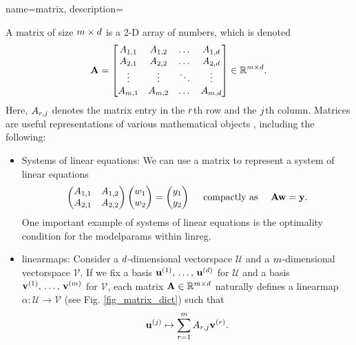 {name={matrix},
	description={A matrix of size $m \times d$ is a 2-D array of numbers, 
 		which is denoted  
		$$
  		{\bf A} = \begin{bmatrix}
   		A_{1,1} & A_{1,2} & \dots  & A_{1,d} \\
		A_{2,1} & A_{2,2} & \dots  & A_{2,d} \\
		\vdots  & \vdots  & \ddots & \vdots \\
		A_{m,1} & A_{m,2} & \dots  & A_{m,d}
		\end{bmatrix} \in \mathbb{R}^{m \times d}.
		$$
		Here, $A_{r,j}$ denotes the matrix entry in the $r$th row and the 
		$j$th column. Matrices are useful representations of various mathematical objects \cite{StrangLinAlg2016},
		including the following:
		\begin{itemize}
			\item Systems of linear equations: We can use a matrix to represent a system of linear equations 
			$$ \begin{pmatrix}
			A_{1,1} & A_{1,2} \\
			A_{2,1} & A_{2,2}
			\end{pmatrix}
			\begin{pmatrix}
				w_1 \\
				w_2
			\end{pmatrix}
			=\begin{pmatrix}
				y_1 \\
				y_2
			\end{pmatrix}
			\quad \text{ compactly as } \quad {\bf A} {\bf w} = {\bf y}.
			$$
    			One important example of systems of linear equations is the optimality condition for the 
    			\gls{modelparams} within \gls{linreg}. 
			\item \Glspl{linearmap}:
			Consider a $d$-dimensional \gls{vectorspace} $\mathcal{U}$ and a $m$-dimensional \gls{vectorspace} $\mathcal{V}$. 
			If we fix a basis $\mathbf{u}^{(1)},\,\ldots,\,\mathbf{u}^{(d)}$ for $\mathcal{U}$ and a basis $\mathbf{v}^{(1)},\,\ldots,\,\mathbf{v}^{(m)}$ 
			for $\mathcal{V}$, each matrix ${\bf A} \in \mathbb{R}^{m \times d}$ naturally defines a 
			\gls{linearmap} $\alpha: \mathcal{U} \rightarrow \mathcal{V}$ (see Fig. \ref{fig_matrix_dict}) such that
   			$${\bf u}^{(j)} \mapsto \sum_{r=1}^{m} A_{r,j} {\bf v}^{(r)}.$$

\end{itemize}}}
